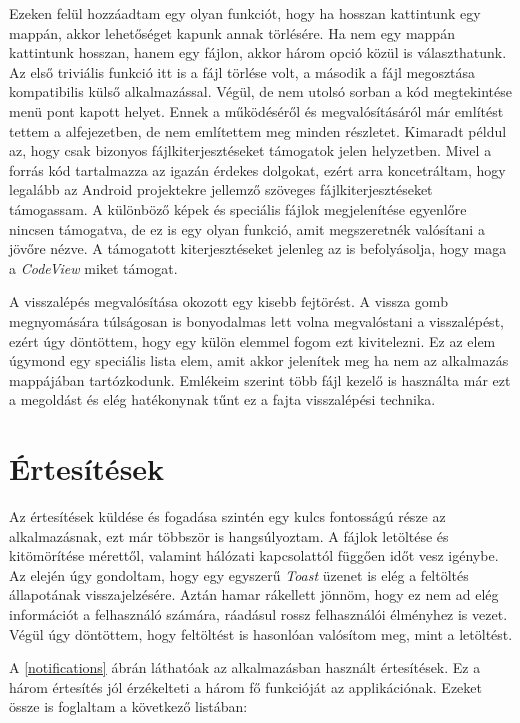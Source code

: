 \documentclass{thesis-ekf}
\theoremstyle{definition}
\theoremstyle{remark}
\begin{document}
Ezeken felül hozzáadtam egy olyan funkciót, hogy ha hosszan kattintunk egy mappán, akkor lehetőséget kapunk annak törlésére.
Ha nem egy mappán kattintunk hosszan, hanem egy fájlon, akkor három opció közül is választhatunk.
Az első triviális funkció itt is a fájl törlése volt, a második a fájl megosztása kompatibilis külső alkalmazással.
Végül, de nem utolsó sorban a kód megtekintése menü pont kapott helyet.
Ennek a működéséről és megvalósításáról már említést tettem a  alfejezetben, de nem említettem meg minden részletet.
Kimaradt példul az, hogy csak bizonyos fájlkiterjesztéseket támogatok jelen helyzetben.
Mivel a forrás kód tartalmazza az igazán érdekes dolgokat, ezért arra koncetráltam, hogy legalább az Android projektekre jellemző szöveges fájlkiterjesztéseket támogassam.
A különböző képek és speciális fájlok megjelenítése egyenlőre nincsen támogatva, de ez is egy olyan funkció, amit megszeretnék valósítani a jövőre nézve.
A támogatott kiterjesztéseket jelenleg az is befolyásolja, hogy maga a \emph{CodeView} miket támogat.

A visszalépés megvalósítása okozott egy kisebb fejtörést.
A vissza gomb megnyomására túlságosan is bonyodalmas lett volna megvalóstani a visszalépést, ezért úgy döntöttem, hogy egy külön elemmel fogom ezt kivitelezni.
Ez az elem úgymond egy speciális lista elem, amit akkor jelenítek meg ha nem az alkalmazás mappájában tartózkodunk.
Emlékeim szerint több fájl kezelő is használta már ezt a megoldást és elég hatékonynak tűnt ez a fajta visszalépési technika.

\section{Értesítések}\label{ertesitesek}

Az értesítések küldése és fogadása szintén egy kulcs fontosságú része az alkalmazásnak, ezt már többször is hangsúlyoztam.
A fájlok letöltése és kitömörítése mérettől, valamint hálózati kapcsolattól függően időt vesz igénybe.
Az elején úgy gondoltam, hogy egy egyszerű \emph{Toast} üzenet is elég a feltöltés állapotának visszajelzésére.
Aztán hamar rákellett jönnöm, hogy ez nem ad elég információt a felhasználó számára, ráadásul rossz felhasználói élményhez is vezet.
Végül úgy döntöttem, hogy feltöltést is hasonlóan valósítom meg, mint a letöltést.

A \ref{notifications} ábrán láthatóak az alkalmazásban használt értesítések.
Ez a három értesítés jól érzékelteti a három fő funkcióját az applikációnak.
Ezeket össze is foglaltam a következő listában:
\end{document}

